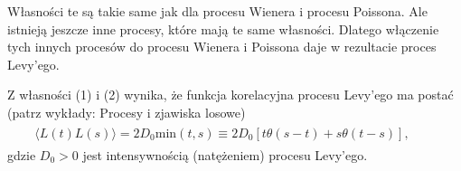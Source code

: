 \documentclass[a4paper,12pt,polish]{sphinxmanual}
\begin{document}
Własności te są takie same jak dla procesu Wienera i procesu Poissona. Ale istnieją jeszcze inne procesy, które mają te same własności. Dlatego włączenie tych innych procesów do procesu Wienera i Poissona daje w rezultacie proces Levy'ego.

Z własności (1) i (2) wynika, że funkcja korelacyjna procesu Levy'ego ma postać (patrz wykłady: Procesy i zjawiska losowe)
\label{ch3/chIII021:equation-eqn50}\begin{gather}
\begin{split}\langle L(t) L(s) \rangle = 2D_0 \mbox{min} (t, s) \equiv 2D_0 [t \theta(s-t) + s \theta(t-s)], \qquad\end{split}\label{ch3/chIII021-eqn50}
\end{gather}
gdzie $D_0 >0$ jest intensywnością (natężeniem) procesu Levy'ego.
\end{document}

